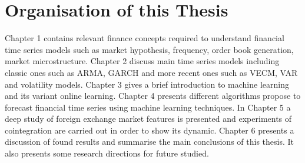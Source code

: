 \section{Organisation of this Thesis}

Chapter 1 contains relevant finance concepts required to understand financial
time series models such as market hypothesis, frequency, order book generation,
market microstructure.
Chapter 2 discuss main time series models including classic ones such as ARMA,
GARCH and more recent ones such as VECM, VAR and volatility models. %
Chapter 3 gives a brief introduction to machine learning and its variant online
learning. 
Chapter 4 presents different algorithms propose to forecast financial time
series using machine learning techniques.
In Chapter 5 a deep study of foreign exchange market features is presented and
experiments of cointegration are carried out in order to show its dynamic.
Chapter 6 presents a discussion of found results and summarise the main
conclusions of this thesis. It also presents some research directions for future
studied.


